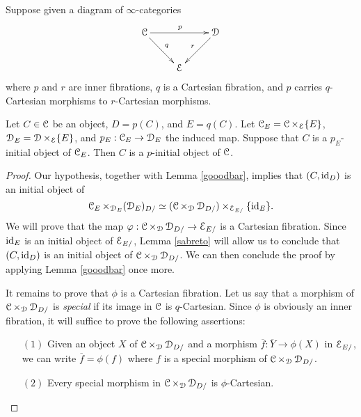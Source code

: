 \begin{proposition}\label{panna}
Suppose given a diagram of $\infty$-categories
$$ \xymatrix{ \calC \ar[dr]^{q} \ar[rr]^{p} & & \calD \ar[dl]_{r} \\
& \calE & }$$
where $p$ and $r$ are inner fibrations, $q$ is a Cartesian fibration, and
$p$ carries $q$-Cartesian morphisms to $r$-Cartesian morphisms.

Let $C \in \operatorname{\mathcal{C}}$ be an object, $D = p(C)$, and $E = q(C)$.
Let $\operatorname{\mathcal{C}}_{E} = \operatorname{\mathcal{C}} \times_{\operatorname{\mathcal{E}}} \{E\}$, $\operatorname{\mathcal{D}}_{E} = \operatorname{\mathcal{D}} \times_{\operatorname{\mathcal{E}}} \{E\}$, and
$p_{E}: \operatorname{\mathcal{C}}_{E} \rightarrow \operatorname{\mathcal{D}}_{E}$ the induced map. Suppose that
$C$ is a $p_{E}$-initial object of $\operatorname{\mathcal{C}}_{E}$. Then $C$ is a $p$-initial object of $\operatorname{\mathcal{C}}$.
\end{proposition}

\begin{proof}
Our hypothesis, together with Lemma \ref{gooodbar}, implies that
$(C, \operatorname{id}_{D})$ is an initial object of
$$\operatorname{\mathcal{C}}_{E} \times_{\operatorname{\mathcal{D}}_{E}} (\operatorname{\mathcal{D}}_{E})_{D/}
\simeq (\operatorname{\mathcal{C}} \times_{\operatorname{\mathcal{D}}} \operatorname{\mathcal{D}}_{D/} ) \times_{\operatorname{\mathcal{E}}_{E/}} \{ \operatorname{id}_{E} \}.$$
We will prove that the map
$\varphi: \operatorname{\mathcal{C}} \times_{\operatorname{\mathcal{D}}} \operatorname{\mathcal{D}}_{D/} \rightarrow \operatorname{\mathcal{E}}_{E/}$ is a Cartesian fibration.
Since $\operatorname{id}_{E}$ is an initial object of $\operatorname{\mathcal{E}}_{E/}$, Lemma \ref{sabreto} will allow us to conclude that
$(C, \operatorname{id}_{D})$ is an initial object of $\operatorname{\mathcal{C}} \times_{\operatorname{\mathcal{D}}} \operatorname{\mathcal{D}}_{D/}$. We can then conclude the proof by applying Lemma \ref{gooodbar} once more.

It remains to prove that $\phi$ is a Cartesian fibration. Let us say that a morphism of
$\operatorname{\mathcal{C}} \times_{\operatorname{\mathcal{D}}} \operatorname{\mathcal{D}}_{D/}$ is {\it special} if its image in $\operatorname{\mathcal{C}}$ is $q$-Cartesian.
Since $\phi$ is obviously an inner fibration, it will suffice to prove the following assertions:

\begin{itemize}
\item[$(1)$] Given an object $X$ of $\operatorname{\mathcal{C}} \times_{\operatorname{\mathcal{D}}} \operatorname{\mathcal{D}}_{D/}$ and
a morphism $\overline{f}: \overline{Y} \rightarrow \phi(X)$ in $\operatorname{\mathcal{E}}_{E/}$, we can write
$\overline{f} = \phi(f)$ where $f$ is a special morphism of $\operatorname{\mathcal{C}} \times_{\operatorname{\mathcal{D}}} \operatorname{\mathcal{D}}_{D/}$.

\item[$(2)$] Every special morphism in $\operatorname{\mathcal{C}} \times_{\operatorname{\mathcal{D}}} \operatorname{\mathcal{D}}_{D/}$ is $\phi$-Cartesian.
\end{itemize}


\end{proof}

